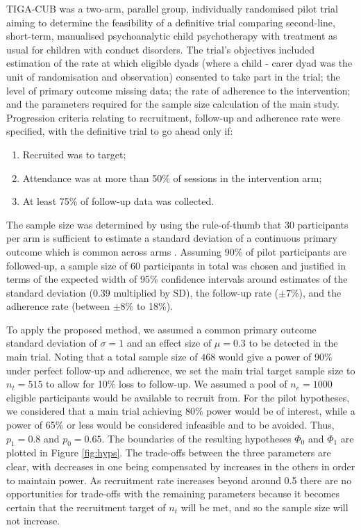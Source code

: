 \documentclass[AMA,STIX1COL]{WileyNJD-v2}
\begin{document}
TIGA-CUB was a two-arm, parallel group, individually randomised pilot trial aiming to determine the feasibility of a definitive trial comparing second-line, short-term, manualised psychoanalytic child psychotherapy with treatment as usual for children with conduct disorders. The trial's objectives included estimation of the rate at which eligible dyads (where a child - carer dyad was the unit of randomisation and observation) consented to take part in the trial; the level of primary outcome missing data; the rate of adherence to the intervention; and the parameters required for the sample size calculation of the main study. Progression criteria relating to recruitment, follow-up and adherence rate were specified, with the definitive trial to go ahead only if:
\begin{enumerate}
\item Recruited was to target;
\item Attendance was at more than 50\% of sessions in the intervention arm;
\item At least 75\% of follow-up data was collected.
\end{enumerate}

The sample size was determined by using the rule-of-thumb that 30 participants per arm is sufficient to estimate a standard deviation of a continuous primary outcome which is common across arms \cite{Lancaster2004}. Assuming 90\% of pilot participants are followed-up, a sample size of 60 participants in total was chosen and justified in terms of the expected width of 95\% confidence intervals around estimates of the standard deviation (0.39 multiplied by SD), the follow-up rate ($\pm 7$\%), and the adherence rate (between $\pm 8$\% to 18\%).

To apply the proposed method, we assumed a common primary outcome standard deviation of $\sigma = 1$ and an effect size of $\mu = 0.3$ to be detected in the main trial. Noting that a total sample size of  $468$ would give a power of 90\% under perfect follow-up and adherence, we set the main trial target sample size to $n_t = 515$ to allow for 10\% loss to follow-up. We assumed a pool of $n_e = 1000$ eligible participants would be available to recruit from. For the pilot hypotheses, we considered that a main trial achieving 80\% power would be of interest, while a power of 65\% or less would be considered infeasible and to be avoided. Thus, $p_1 = 0.8$ and $p_0 = 0.65$. The boundaries of the resulting hypotheses $\Phi_0$ and $\Phi_1$ are plotted in Figure \ref{fig:hyps}. The trade-offs between the three parameters are clear, with decreases in one being compensated by increases in the others in order to maintain power. As recruitment rate increases beyond around 0.5 there are no opportunities for trade-offs with the remaining parameters because it becomes certain that the recruitment target of $n_t$ will be met, and so the sample size will not increase.
\end{document}
